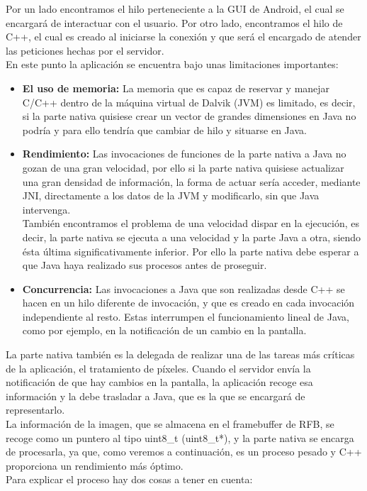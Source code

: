 Por un lado encontramos el hilo perteneciente a la GUI de Android, el cual se encargará de interactuar con el usuario. Por otro lado, encontramos el hilo de C++, el cual es creado al iniciarse la conexión y que será el encargado de atender las peticiones hechas por el servidor.\\

En este punto la aplicación se encuentra bajo unas limitaciones importantes:
\begin{itemize}
\item \textbf{El uso de memoria:} La memoria que es capaz de reservar y manejar C/C++ dentro de la máquina virtual de Dalvik (JVM) es limitado, es decir, si la parte nativa quisiese crear un vector de grandes dimensiones en Java no podría y para ello tendría que cambiar de hilo y situarse en Java.
\item \textbf{Rendimiento:} Las invocaciones de funciones de la parte nativa a Java no gozan de una gran velocidad, por ello si la parte nativa quisiese actualizar una gran densidad de información, la forma de actuar sería acceder, mediante JNI, directamente a los datos de la JVM y modificarlo, sin que Java intervenga.\\

También encontramos el problema de una velocidad dispar en la ejecución, es decir, la parte nativa se ejecuta a una velocidad y la parte Java a otra, siendo ésta última significativamente inferior. Por ello la parte nativa debe esperar a que Java haya realizado sus procesos antes de proseguir.

\item \textbf{Concurrencia:} Las invocaciones a Java que son realizadas desde C++ se hacen en un hilo diferente de invocación, y que es creado en cada invocación independiente al resto. Estas interrumpen el funcionamiento lineal de Java, como por ejemplo, en la notificación de un cambio en la pantalla.

\end{itemize}

La parte nativa también es la delegada de realizar una de las tareas más críticas de la aplicación, el tratamiento de píxeles. Cuando el servidor envía la notificación de que hay cambios en la pantalla, la aplicación recoge esa información y la debe trasladar a Java, que es la que se encargará de representarlo.\\

La información de la imagen, que se almacena en el framebuffer de RFB, se recoge como un puntero al tipo uint8\_t (uint8\_t*), y la parte nativa se encarga de procesarla, ya que, como veremos a continuación, es un proceso pesado y C++ proporciona un rendimiento más óptimo.\\
Para explicar el proceso hay dos cosas a tener en cuenta:\\

